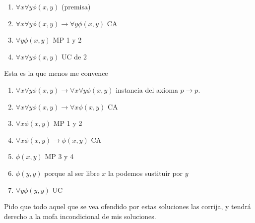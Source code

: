 \begin{problem}
\spart

\begin{enumerate}
	\item $ \forall x \forall y \phi (x,y)$ (premisa)
	\item $ \forall x \forall y \phi (x,y) \to \forall y \phi (x,y)$ CA
	\item $\forall y \phi (x,y)$ MP 1 y 2
	\item $\forall x \forall y \phi (x,y)$ UC de 2
\end{enumerate}

\spart

{\color{orange} Esta es la que menos me convence}

\begin{enumerate}
	\item $\forall x \forall y \phi (x,y) \to \forall x \forall y \phi (x,y)$ instancia del axioma $p \to p$.
	\item $\forall x \forall y \phi (x,y) \to \forall x \phi (x,y)$ CA
	\item $\forall x \phi (x,y)$ MP 1 y 2
	\item $\forall x \phi (x,y) \to \phi(x,y)$ CA
	\item $\phi(x,y)$ MP 3 y 4
	\item $\phi(y,y)$ porque al ser libre $x$ la podemos sustituir por $y$
	\item $\forall y \phi(y,y)$ UC
\end{enumerate}

{\color{orange} Pido que todo aquel que se vea ofendido por estas soluciones las corrija, y tendrá derecho a la mofa incondicional de mis soluciones.}

\end{problem}
